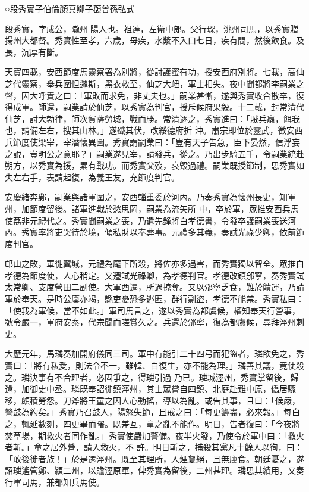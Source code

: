 
\begin{pinyinscope}

 ○段秀實子伯倫顏真卿子頵曾孫弘式



 段秀實，字成公，隴州陽人也。祖達，左衛中郎。父行琛，洮州司馬，以秀實贈揚州大都督。秀實性至孝，六歲，母疾，水漿不入口七日，疾有間，然後飲食。及長，沉厚有斷。



 天寶四載，安西節度馬靈察署為別將，從討護蜜有功，授安西府別將。七載，高仙芝代靈察，舉兵圍怛邏斯，黑衣救至，仙芝大衄，軍士相失。夜中聞都將李嗣業之聲，因大呼責之曰：「軍敗而求免，非丈夫也。」嗣業甚慚，遂與秀實收合散卒，復得成軍。師還，嗣業請於仙芝，以秀實為判官，授斥候府果毅。十二載，封常清代仙芝，討大勃律，師次賀薩勞城，戰而勝。常清逐之，秀實進曰：「賊兵羸，餌我也，請備左右，搜其山林。」遂殲其伏，改綏德府折
 沖。肅宗即位於靈武，徵安西兵節度使梁宰，宰潛懷異圖。秀實謂嗣業曰：「豈有天子告急，臣下晏然，信浮妄之說，豈明公之意耶？」嗣業遂見宰，請發兵，從之。乃出步騎五千，令嗣業統赴朔方，以秀實為援，累有戰功。而秀實父歿，哀毀過禮。嗣業既授節制，思秀實如失左右手，表請起復，為義王友，充節度判官。



 安慶緒奔鄴，嗣業與諸軍圍之，安西輜重委於河內。乃奏秀實為懷州長史，知軍州，加節度留後。諸軍進戰於愁思岡，嗣業為流矢所
 中，卒於軍，眾推安西兵馬使荔非元禮代之。秀實聞嗣業之喪，乃遺先鋒將白孝德書，令發卒護嗣業喪送河內。秀實率將吏哭待於境，傾私財以奉葬事。元禮多其義，奏試光祿少卿，依前節度判官。



 邙山之敗，軍徙翼城，元禮為麾下所殺，將佐亦多遇害，而秀實獨以智全。眾推白孝德為節度使，人心稍定。又遷試光祿卿，為孝德判官。孝德改鎮邠寧，奏秀實試太常卿、支度營田二副使。大軍西遷，所過掠奪。又以邠寧乏食，難於饋運，乃請
 軍於奉天。是時公廩亦竭，縣吏憂恐多逃匿，群行剽盜，孝德不能禁。秀實私曰：「使我為軍候，當不如此。」軍司馬言之，遂以秀實為都虞候，權知奉天行營事，號令嚴一，軍府安泰，代宗聞而嗟賞久之。兵還於邠寧，復為都虞候，尋拜涇州刺史。



 大歷元年，馬璘奏加開府儀同三司。軍中有能引二十四弓而犯盜者，璘欲免之，秀實曰：「將有私愛，則法令不一，雖韓、白復生，亦不能為理。」璘善其議，竟使殺之。璘決事有不合理者，必固爭之，得璘引過
 乃已。璘城涇州，秀實掌留後，歸還，加御史中丞。璘既奉詔徙鎮涇州，其士眾嘗自四鎮、北庭赴難中原，僑居驟移，頗積勞怨。刀斧將王童之因人心動搖，導以為亂。或告其事，且曰：「候嚴，警鼓為約矣。」秀實乃召鼓人，陽怒失節，且戒之曰：「每更籌盡，必來報。」每白之，輒延數刻，四更畢而曙。既差互，童之亂不能作。明日，告者復曰：「今夜將焚草場，期救火者同作亂。」秀實使嚴加警備。夜半火發，乃使令於軍中曰：「救火者斬。」童之居外營，請入救火，不
 許。明日斬之，捕殺其黨凡十餘人以徇，曰：「敢後徙者族！」於是遷涇州。既至其理所，人煙夐絕，且無廩食。朝廷憂之，遂詔璘遙管鄭、潁二州，以贍涇原軍，俾秀實為留後，二州甚理。璘思其績用，又奏行軍司馬，兼都知兵馬使。




\end{pinyinscope}
